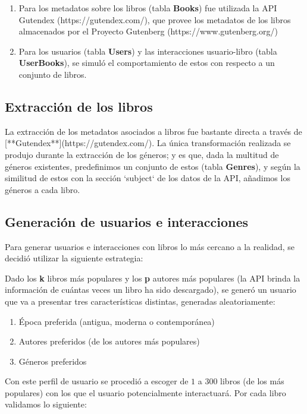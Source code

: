 \documentclass[14pt]{extarticle}
\begin{document}
\begin{enumerate}
    \item Para los metadatos sobre los libros (tabla \textbf{Books}) fue utilizada la API Gutendex (https://gutendex.com/), que provee los metadatos de los libros almacenados por el Proyecto Gutenberg (https://www.gutenberg.org/)
    \item Para los usuarios (tabla \textbf{Users}) y las interacciones usuario-libro (tabla \textbf{UserBooks}), se simuló el comportamiento de estos con respecto a un conjunto de libros.
\end{enumerate}

\subsection{Extracción de los libros}

La extracción de los metadatos asociados a libros fue bastante directa a través de [**Gutendex**](https://gutendex.com/). La única transformación realizada se produjo durante la extracción de los géneros; y es que, dada la multitud de géneros existentes, predefinimos un conjunto de estos (tabla \textbf{Genres}), y según la similitud de estos con la sección `subject` de los datos de la API, añadimos los géneros a cada libro.

\subsection{Generación de usuarios e interacciones}

Para generar usuarios e interacciones con libros lo más cercano a la realidad, se decidió utilizar la siguiente estrategia:

Dado los \textbf{k} libros más populares y los \textbf{p} autores más populares (la API brinda la información de cuántas veces un libro ha sido descargado), se generó un usuario que va a presentar tres características distintas, generadas aleatoriamente:

\begin{enumerate}
    \item Época preferida (antigua, moderna o contemporánea)
    \item Autores preferidos (de los autores más populares)
    \item Géneros preferidos
\end{enumerate}

Con este perfil de usuario se procedió a escoger de $1$ a $300$ libros (de los más populares) con los que el usuario potencialmente interactuará. Por cada libro validamos lo siguiente:
\end{document}
